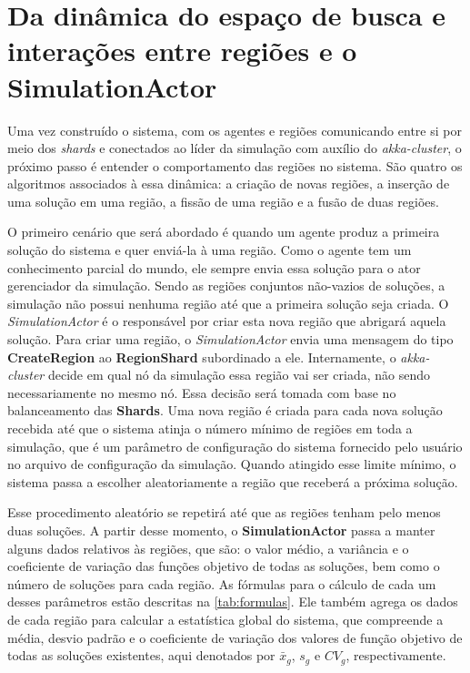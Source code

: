  
\section{Da dinâmica do espaço de busca e interações entre regiões e o SimulationActor}
\label{sec:dinamica}
Uma vez construído o sistema, com os agentes e regiões comunicando entre si por meio dos \textit{shards} e conectados ao líder da simulação com auxílio do \textit{akka-cluster}, o próximo passo é entender o comportamento das regiões no sistema. São quatro os algoritmos associados à essa dinâmica: a criação de novas regiões, a inserção de uma solução em uma região, a fissão de uma região e a fusão de duas regiões. 

O primeiro cenário que será abordado é quando um agente produz a primeira solução do sistema e quer enviá-la à uma região. Como o agente tem um conhecimento parcial do mundo, ele sempre envia essa solução para o ator gerenciador da simulação. Sendo as regiões conjuntos não-vazios de soluções, a simulação não possui nenhuma região até que a primeira solução seja criada. O \textit{SimulationActor} é o responsável por criar esta nova região que abrigará aquela solução. Para criar uma região, o \textit{SimulationActor} envia uma mensagem do tipo \textbf{CreateRegion} ao \textbf{RegionShard} subordinado a ele. Internamente, o \textit{akka-cluster} decide em qual nó da simulação essa região vai ser criada, não sendo necessariamente no mesmo nó. Essa decisão será tomada com base no balanceamento das \textbf{Shards}. Uma nova região é criada para cada nova solução recebida até que o sistema atinja o número mínimo de regiões em toda a simulação, que é um parâmetro de configuração do sistema fornecido pelo usuário no arquivo de configuração da simulação. Quando atingido esse limite mínimo, o sistema passa a escolher aleatoriamente a região que receberá a próxima solução.

Esse procedimento aleatório se repetirá até que as regiões tenham pelo menos duas soluções. A partir desse momento, o \textbf{SimulationActor} passa a manter alguns dados relativos às regiões, que são: o valor médio, a variância e o coeficiente de variação das funções objetivo de todas as soluções, bem como o número de soluções para cada região. As fórmulas para o cálculo de cada um desses parâmetros estão descritas na \autoref{tab:formulas}. Ele também agrega os dados de cada região para calcular a estatística global do sistema, que compreende a média, desvio padrão e o coeficiente de variação dos valores de função objetivo de todas as soluções existentes, aqui denotados por $\bar{x}_g$, $s_g$ e $CV_g$, respectivamente.

